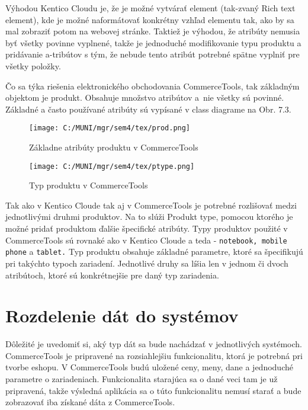\documentclass[
  printed, %
  table,   %
  lof,     %
  nolot,     %
  twoside,  
]{fithesis3}
\begin{document}
Výhodou Kentico Cloudu je, že je možné vytvárať element (tak-zvaný Rich text element), kde je možné naformátovať  konkrétny vzhľad elementu tak, ako by sa mal zobraziť potom na webovej stránke. Taktiež je výhodou, že atribúty nemusia byť všetky povinne vyplnené, takže je jednoduché modifikovanie typu produktu a pridávanie a-tribútov s tým, že nebude tento atribút potrebné spätne vyplniť pre všetky položky.

 Čo sa týka riešenia elektronického obchodovania CommerceTools, tak základným objektom je produkt. Obsahuje množstvo atribútov a~nie všetky sú povinné. Základné a často používané atribúty sú vypísané v class diagrame na Obr. 7.3. 
 
 
 \begin{figure}[h]
  \begin{center}
        \texttt{[image: C:/MUNI/mgr/sem4/tex/prod.png]}
  \end{center}
  \caption{Základne atribúty produktu v CommerceTools}
  \label{fig:produkt}
\end{figure}

\begin{figure}[h]
  \begin{center}
        \texttt{[image: C:/MUNI/mgr/sem4/tex/ptype.png]}
  \end{center}
  \caption{Typ produktu v CommerceTools}
  \label{fig:produkt type}
\end{figure}

 Tak ako v Kentico Cloude tak aj v CommerceTools je potrebné rozlišovať medzi jednotlivými druhmi produktov. Na to slúži Produkt type, pomocou ktorého je možné pridať produktom ďalšie špecifické atribúty. Typy produktov použité v CommerceTools sú rovnaké ako v Kentico Cloude a teda - \texttt{notebook, mobile phone} a \texttt{tablet.} Typ produktu obsahuje základné parametre, ktoré sa špecifikujú pri takýchto typoch zariadení. Jednotlivé druhy sa líšia len v jednom či dvoch atribútoch, ktoré sú konkrétnejšie pre daný typ zariadenia.




\section{Rozdelenie dát do systémov}
Dôležité je uvedomiť si, aký typ dát sa bude nachádzať v jednotlivých systémoch. CommerceTools je pripravené na rozsiahlejšiu funkcionalitu, ktorá je potrebná pri tvorbe eshopu. V CommerceTools budú uložené ceny, meny, dane a jednoduché parametre o zariadeniach. Funkcionalita starajúca sa o dané veci tam je už pripravená, takže výsledná aplikácia sa o túto funkcionalitu nemusí starať a bude zobrazovať iba získané dáta z CommerceTools.
\end{document}
